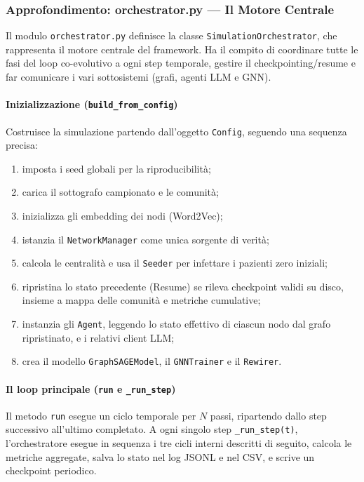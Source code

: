 \documentclass[11pt, a4paper]{article}
\begin{document}
\subsubsection{Approfondimento: orchestrator.py — Il Motore Centrale}
Il modulo \texttt{orchestrator.py} definisce la classe \texttt{SimulationOrchestrator}, che rappresenta il motore centrale del framework. Ha il compito di coordinare tutte le fasi del loop co-evolutivo a ogni step temporale, gestire il checkpointing/resume e far comunicare i vari sottosistemi (grafi, agenti LLM e GNN).

\paragraph{Inizializzazione (\texttt{build\_from\_config})}
Costruisce la simulazione partendo dall'oggetto \texttt{Config}, seguendo una sequenza precisa:
\begin{enumerate}
    \item imposta i seed globali per la riproducibilità;
    \item carica il sottografo campionato e le comunità;
    \item inizializza gli embedding dei nodi (Word2Vec);
    \item istanzia il \texttt{NetworkManager} come unica sorgente di verità;
    \item calcola le centralità e usa il \texttt{Seeder} per infettare i pazienti zero iniziali;
    \item ripristina lo stato precedente (Resume) se rileva checkpoint validi su disco, insieme a mappa delle comunità e metriche cumulative;
    \item instanzia gli \texttt{Agent}, leggendo lo stato effettivo di ciascun nodo dal grafo ripristinato, e i relativi client LLM;
    \item crea il modello \texttt{GraphSAGEModel}, il \texttt{GNNTrainer} e il \texttt{Rewirer}.
\end{enumerate}

\paragraph{Il loop principale (\texttt{run} e \texttt{\_run\_step})}
Il metodo \texttt{run} esegue un ciclo temporale per $N$ passi, ripartendo dallo step successivo all'ultimo completato. A ogni singolo step \texttt{\_run\_step(t)}, l'orchestratore esegue in sequenza i tre cicli interni descritti di seguito, calcola le metriche aggregate, salva lo stato nel log JSONL e nel CSV, e scrive un checkpoint periodico.
\end{document}
